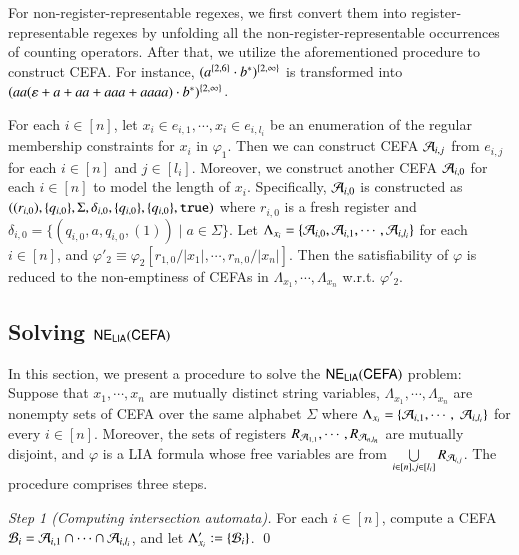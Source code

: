 For non-register-representable regexes, we first convert them into register-representable regexes by unfolding all the non-register-representable occurrences of counting operators. After that, we utilize the aforementioned procedure to construct CEFA. For instance, $(a^{\{2, 6\}} \cdot b^*)^{\{2,\infty\}}$ is transformed into $(aa(\varepsilon + a + aa + aaa+aaaa) \cdot b^*)^{\{2, \infty\}}$. 

For each $i \in [n]$, let $x_i \in e_{i, 1}, \cdots, x_i \in e_{i, l_i}$ be an enumeration of the regular membership constraints for $x_i$ in $\varphi_1$.  Then we can construct CEFA $\mathcal{A}_{i, j}$ from $e_{i, j}$ for each $i \in [n]$ and $j \in [l_i]$. Moreover, we construct another CEFA $\mathcal{A}_{i, 0}$ for each $i \in [n]$ to model the length of $x_i$. Specifically, $\mathcal{A}_{i,0}$ is constructed as $((r_{i,0}), \{q_{i,0}\}, \Sigma, \delta_{i,0}, \{q_{i,0}\}, \{q_{i,0}\}, \mathtt{true})$ where $r_{i,0}$ is a fresh register and $\delta_{i,0} = \{(q_{i,0}, a, q_{i,0}, (1)) \mid a \in \Sigma\}$. 
Let $\Lambda_{x_i} = \{\mathcal{A}_{i,0}, \mathcal{A}_{i, 1}, \cdots, \mathcal{A}_{i, l_i}\}$ for each $i \in [n]$, and $\varphi'_2 \equiv \varphi_2[r_{1,0}/|x_1|, \cdots, r_{n,0}/|x_n|]$. Then the satisfiability of $\varphi$ is reduced to the non-emptiness of CEFAs in $\Lambda_{x_1}, \cdots, \Lambda_{x_n}$ w.r.t. $\varphi'_2$.


\subsection{Solving ${\sf NE_{LIA}(CEFA)}$} \label{subsec:cefadec}

In this section, we present a procedure to solve the ${\sf NE_{LIA}(CEFA)}$ problem: Suppose that $x_1, \cdots, x_n$ are mutually distinct string variables, $\Lambda_{x_1}, \cdots, \Lambda_{x_n}$ are nonempty sets of CEFA over the same alphabet $\Sigma$ where $\Lambda_{x_i} = \{\mathcal{A}_{i, 1}, \cdots,$ $ \mathcal{A}_{i, l_i}\}$ for every $i \in [n]$. Moreover, the sets of registers $R_{\mathcal{A}_{1, 1}}, \cdots, R_{\mathcal{A}_{n, l_n}}$ are mutually disjoint, and $\varphi$ is a LIA formula whose free variables are from $\bigcup \limits_{i \in [n], j \in [l_i]} R_{\mathcal{A}_{i, j}}$. 
The procedure comprises three steps. 

\medskip
\noindent
\emph{Step 1 (Computing intersection automata).} For each $i \in [n]$, compute a CEFA $\mathcal{B}_{i} = \mathcal{A}_{i,1} \cap \cdots \cap \mathcal{A}_{i, l_i}$, and let $\Lambda'_{x_i} := \{\mathcal{B}_i\}$. \qed

